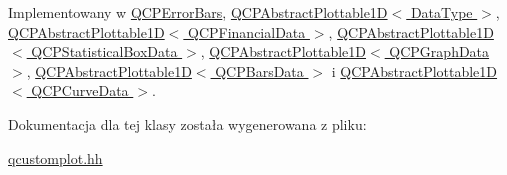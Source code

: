 Implementowany w \hyperlink{class_q_c_p_error_bars_af75958b95d9b9c7edfd9851c1d123850}{Q\+C\+P\+Error\+Bars}, \hyperlink{class_q_c_p_abstract_plottable1_d_afe0d56e39cc076032922f059b304c092}{Q\+C\+P\+Abstract\+Plottable1\+D$<$ Data\+Type $>$}, \hyperlink{class_q_c_p_abstract_plottable1_d_afe0d56e39cc076032922f059b304c092}{Q\+C\+P\+Abstract\+Plottable1\+D$<$ Q\+C\+P\+Financial\+Data $>$}, \hyperlink{class_q_c_p_abstract_plottable1_d_afe0d56e39cc076032922f059b304c092}{Q\+C\+P\+Abstract\+Plottable1\+D$<$ Q\+C\+P\+Statistical\+Box\+Data $>$}, \hyperlink{class_q_c_p_abstract_plottable1_d_afe0d56e39cc076032922f059b304c092}{Q\+C\+P\+Abstract\+Plottable1\+D$<$ Q\+C\+P\+Graph\+Data $>$}, \hyperlink{class_q_c_p_abstract_plottable1_d_afe0d56e39cc076032922f059b304c092}{Q\+C\+P\+Abstract\+Plottable1\+D$<$ Q\+C\+P\+Bars\+Data $>$} i \hyperlink{class_q_c_p_abstract_plottable1_d_afe0d56e39cc076032922f059b304c092}{Q\+C\+P\+Abstract\+Plottable1\+D$<$ Q\+C\+P\+Curve\+Data $>$}.



Dokumentacja dla tej klasy została wygenerowana z pliku\+:\begin{DoxyCompactItemize}
\item 
\hyperlink{qcustomplot_8hh}{qcustomplot.\+hh}\end{DoxyCompactItemize}
